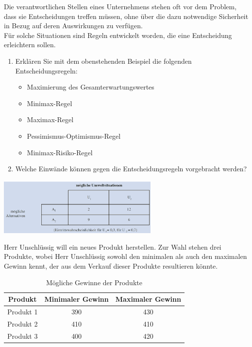 Die verantwortlichen Stellen eines Unternehmens stehen oft vor dem Problem, dass sie Entscheidungen treffen müssen, ohne über die dazu notwendige Sicherheit in Bezug auf deren Auswirkungen zu verfügen.\\
Für solche Situationen sind Regeln entwickelt worden, die eine Entscheidung erleichtern sollen.

\begin{enumerate}[label=(\alph*)]
    \item Erklären Sie mit dem obenstehenden Beispiel die folgenden Entscheidungsregeln:
    \begin{itemize}
        \item Maximierung des Gesamterwartungswertes
        \item Minimax-Regel
        \item Maximax-Regel
        \item Pessimismus-Optimismus-Regel
        \item Minimax-Risiko-Regel
    \end{itemize}
    \item Welche Einwände können gegen die Entscheidungsregeln vorgebracht werden?
\end{enumerate}
\includegraphics[width=0.6\textwidth]{figures/9_2.png}

Herr Unschlüssig will ein neues Produkt herstellen. Zur Wahl stehen drei Produkte, wobei Herr Unschlüssig sowohl den minimalen als auch den maximalen Gewinn kennt, der aus dem Verkauf dieser Produkte resultieren könnte.

\begin{table}[h!]
\centering
\begin{tabular}{|c|c|c|}
\hline
\textbf{Produkt} & \textbf{Minimaler Gewinn} & \textbf{Maximaler Gewinn} \\
\hline
Produkt 1 & 390 & 430 \\
\hline
Produkt 2 & 410 & 410 \\
\hline
Produkt 3 & 400 & 420 \\
\hline
\end{tabular}
\caption{Mögliche Gewinne der Produkte}
\end{table}

